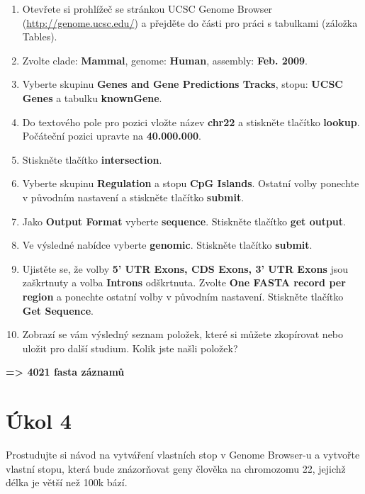 \documentclass[11pt]{article}
\begin{document}
\begin{enumerate}
\item Otevřete si prohlížeč se stránkou UCSC Genome Browser
(\url{http://genome.ucsc.edu/}) a přejděte do části pro práci s tabulkami (záložka
Tables).
\item Zvolte clade: \textbf{Mammal}, genome: \textbf{Human}, assembly: \textbf{Feb. 2009}.
\item Vyberte skupinu \textbf{Genes and Gene Predictions Tracks}, stopu: \textbf{UCSC Genes} a
tabulku \textbf{knownGene}.
\item Do textového pole pro pozici vložte název \textbf{chr22} a stiskněte tlačítko
\textbf{lookup}. Počáteční pozici upravte na \textbf{40.000.000}.
\item Stiskněte tlačítko \textbf{intersection}.
\item Vyberte skupinu \textbf{Regulation} a stopu \textbf{CpG Islands}. Ostatní volby ponechte v
původním nastavení a stiskněte tlačítko \textbf{submit}.
\item Jako \textbf{Output Format} vyberte \textbf{sequence}. Stiskněte tlačítko \textbf{get output}.
\item Ve výsledné nabídce vyberte \textbf{genomic}. Stiskněte tlačítko \textbf{submit}.
\item Ujistěte se, že volby \textbf{5' UTR Exons, CDS Exons, 3' UTR Exons} jsou zaškrtnuty
a volba \textbf{Introns} odškrtnuta. Zvolte \textbf{One FASTA record per region} a ponechte
ostatní volby v původním nastavení. Stiskněte tlačítko \textbf{Get Sequence}.
\item Zobrazí se vám výsledný seznam položek, které si můžete zkopírovat nebo
uložit pro další studium. Kolik jste našli položek?
\end{enumerate}

\textbf{=> 4021 fasta záznamů}

\section{Úkol 4}
\label{sec:org84ea6a1}
Prostudujte si návod na vytváření vlastních stop v Genome Browser-u a vytvořte
vlastní stopu, která bude znázorňovat geny člověka na chromozomu 22, jejichž
délka je větší než 100k bází.
\end{document}
